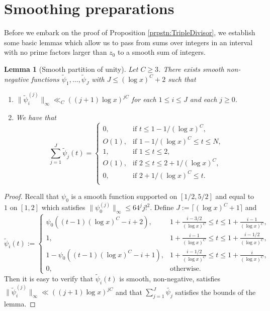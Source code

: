\documentclass[10pt]{amsart}
\theoremstyle{plain}
\newtheorem{lmm}[thrm]{Lemma}
\numberwithin{equation}{section}
\begin{document}
\section{Smoothing preparations}\label{sec:Smoothing}
%
%
%
%
Before we embark on the proof of Proposition \ref{prpstn:TripleDivisor}, we establish some basic lemmas which allow us to pass from sums over integers in an interval with no prime factors larger than $z_0$ to a smooth sum of integers.
%
%
%
%
%
%
%
%
\begin{lmm}[Smooth partition of unity]\label{lmm:Partition}
Let $C\ge 3$. There exists smooth non-negative functions $\widetilde{\psi}_1,\dots,\widetilde{\psi}_J$ with $J\le (\log{x})^C+2$ such that
\begin{enumerate}
\item $\|\widetilde{\psi}_i^{(j)}\|_\infty\ll_{C} ((j+1)\log{x})^{j C}$ for each $1\le i\le J$ and each $j\ge 0$.
\item We have that
\[
\sum_{j=1}^J \widetilde{\psi}_j(t)=\begin{cases}
0,\qquad &\text{if }t\le 1-1/(\log{x})^C,\\
O(1), &\text{if }1-1/(\log{x})^C\le t\le N,\\
1,&\text{if }1\le t\le 2,\\
O(1), &\text{if }2\le t\le 2+1/(\log{x})^C,\\
0, &\text{if }2+1/(\log{x})^C\le t.\\
\end{cases}
\]
\end{enumerate}
\end{lmm}
%
%
%
%
\begin{proof}
Recall that $\psi_0$ is a smooth function supported on $[1/2,5/2]$ and equal to $1$ on $[1,2]$ which satisfies $\|\psi_0^{(j)}\|_\infty\le 64^j j!^2$. Define $J:=\lceil(\log{x})^C+1\rceil$ and
\[
\widetilde{\psi}_i(t):=\begin{cases}
\psi_0((t-1)(\log{x})^C-i+2),&1+\frac{i-3/2}{(\log{x})^C}\le t\le 1+\frac{i-1}{(\log{x})^C},\\
1,&1+\frac{i-1}{(\log{x})^C}\le t \le 1+\frac{i-1/2}{(\log{x})^C},\\
1-\psi_0((t-1)(\log{x})^C-i+1),&1+\frac{i-1/2}{(\log{x})^C}\le t\le 1+\frac{i}{(\log{x})^C},\\
0,&\text{otherwise.}
\end{cases}
\]
Then it is easy to verify that $\widetilde{\psi}_i(t)$ is smooth, non-negative, satisfies $\|\widetilde{\psi}_i^{(j)}\|_\infty\ll ((j+1)\log{x})^{j C}$ and that $\sum_{j=1}^J\widetilde{\psi_j}$ satisfies the bounds of the lemma. 
\end{proof}
\end{document}
